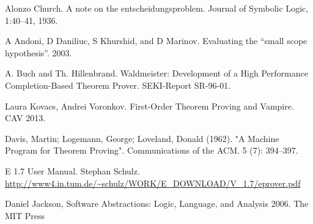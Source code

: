 \begin{thebibliography}{tesis}
 Alonzo Church. A note on the entscheidungsproblem. Journal of Symbolic Logic, 1:40–41, 1936.

 A Andoni, D Daniliuc, S Khurshid, and D Marinov. Evaluating the
“small scope hypothesis”. 2003.

 A. Buch and Th. Hillenbrand. Waldmeister: Development of a High Performance Completion-Based Theorem Prover. SEKI-Report SR-96-01.

 Laura Kovacs, Andrei Voronkov. First-Order Theorem Proving and Vampire. CAV 2013.

 Davis, Martin; Logemann, George; Loveland, Donald (1962). "A Machine Program for Theorem Proving". Communications of the ACM. 5 (7): 394–397.

	E 1.7 User Manual. Stephan Schulz.
	\url{http://www4.in.tum.de/~schulz/WORK/E_DOWNLOAD/V_1.7/eprover.pdf}

	Daniel Jackson, Software Abstractions: Logic, Language, and Analysis 2006. The MIT Press

\end{thebibliography}

